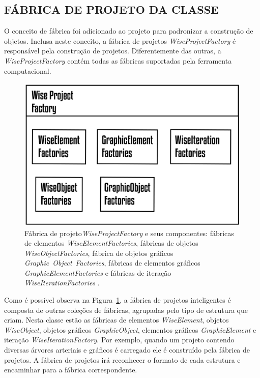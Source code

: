 \subsection{FÁBRICA DE PROJETO DA CLASSE}\label{sec:fabrica_projeto} 

O conceito de fábrica foi adicionado ao projeto para padronizar a construção de objetos. Inclusa neste conceito, a fábrica de projetos \textit{WiseProjectFactory} é responsável pela construção de projetos. Diferentemente das outras, a  \textit{WiseProjectFactory} contém todas as fábricas suportadas pela ferramenta computacional.

\begin{figure}[!htbp]
	\centering
	\includegraphics[scale=1.5]{Figures/WiseProjectFactory@16x.png}
	\caption{Fábrica de projeto\textit{WiseProjectFactory} e seus componentes: fábricas de elementos \textit{WiseElementFactories}, fábricas de objetos \textit{WiseObjectFactories}, fábrica de objetos gráficos \emph{Gra}\-\emph{phic}~\-\emph{Object}~\-\emph{Facto\-ries}, fábricas de elementos gráficos \textit{GraphicElementFactories} e fábricas de iteração \textit{WiseIterationFactories} .}
	\label{fig7:projectfactory}
\end{figure}

Como é possível observa na Figura~\ref{fig7:projectfactory}, a fábrica de projetos inteligentes é composta de outras coleções de fábricas, agrupadas pelo tipo de estrutura que criam. Nesta classe estão as fábricas de elementos \textit{WiseElement}, objetos \textit{WiseObject}, objetos gráficos \textit{GraphicObject}, elementos gráficos \textit{GraphicElement} e iteração \textit{WiseIterationFactory}. Por exemplo, quando um projeto contendo diversas árvores arteriais e gráficos é carregado ele é construído pela fábrica de projetos. A fábrica de projetos irá reconhecer o formato de cada estrutura e encaminhar para a fábrica correspondente.

